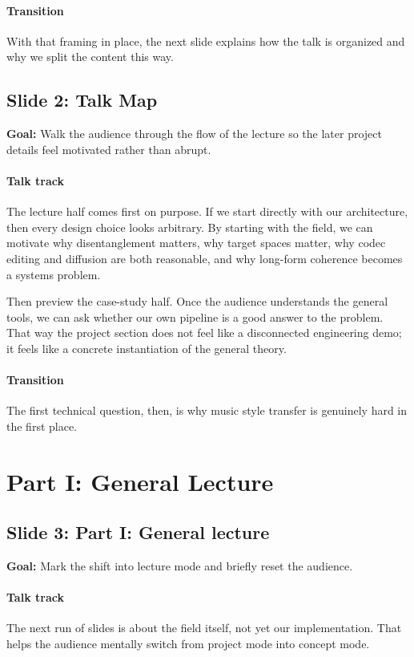 \documentclass[11pt]{article}
\begin{document}
\paragraph{Transition}
With that framing in place, the next slide explains how the talk is organized and why we split the content this way.

\subsection*{Slide 2: Talk Map}
\textbf{Goal:} Walk the audience through the flow of the lecture so the later project details feel motivated rather than abrupt.
\paragraph{Talk track}
The lecture half comes first on purpose. If we start directly with our architecture, then every design choice looks arbitrary. By starting with the field, we can motivate why disentanglement matters, why target spaces matter, why codec editing and diffusion are both reasonable, and why long-form coherence becomes a systems problem.

Then preview the case-study half. Once the audience understands the general tools, we can ask whether our own pipeline is a good answer to the problem. That way the project section does not feel like a disconnected engineering demo; it feels like a concrete instantiation of the general theory.

\paragraph{Transition}
The first technical question, then, is why music style transfer is genuinely hard in the first place.

\newpage
\section{Part I: General Lecture}
\subsection*{Slide 3: Part I: General lecture}
\textbf{Goal:} Mark the shift into lecture mode and briefly reset the audience.
\paragraph{Talk track}
The next run of slides is about the field itself, not yet our implementation. That helps the audience mentally switch from project mode into concept mode.
\end{document}
